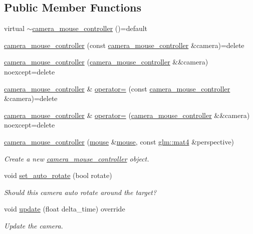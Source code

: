 \subsection*{Public Member Functions}
\begin{DoxyCompactItemize}
\item 
virtual \mbox{\hyperlink{classmoka_1_1camera__mouse__controller_ae40951c1866e72474b6ed7324e6db72f}{$\sim$camera\+\_\+mouse\+\_\+controller}} ()=default
\item 
\mbox{\hyperlink{classmoka_1_1camera__mouse__controller_aca731723969ae09a48d21f0c5814ba27}{camera\+\_\+mouse\+\_\+controller}} (const \mbox{\hyperlink{classmoka_1_1camera__mouse__controller}{camera\+\_\+mouse\+\_\+controller}} \&camera)=delete
\item 
\mbox{\hyperlink{classmoka_1_1camera__mouse__controller_ab07b5dda70f97878a888e406e3be3bb4}{camera\+\_\+mouse\+\_\+controller}} (\mbox{\hyperlink{classmoka_1_1camera__mouse__controller}{camera\+\_\+mouse\+\_\+controller}} \&\&camera) noexcept=delete
\item 
\mbox{\hyperlink{classmoka_1_1camera__mouse__controller}{camera\+\_\+mouse\+\_\+controller}} \& \mbox{\hyperlink{classmoka_1_1camera__mouse__controller_a510baecd761914c83b7330549dbb7197}{operator=}} (const \mbox{\hyperlink{classmoka_1_1camera__mouse__controller}{camera\+\_\+mouse\+\_\+controller}} \&camera)=delete
\item 
\mbox{\hyperlink{classmoka_1_1camera__mouse__controller}{camera\+\_\+mouse\+\_\+controller}} \& \mbox{\hyperlink{classmoka_1_1camera__mouse__controller_a5e016278de0bea6870520235fee70dba}{operator=}} (\mbox{\hyperlink{classmoka_1_1camera__mouse__controller}{camera\+\_\+mouse\+\_\+controller}} \&\&camera) noexcept=delete
\item 
\mbox{\hyperlink{classmoka_1_1camera__mouse__controller_a82038995539fcb2b51f88d2669bb6fcb}{camera\+\_\+mouse\+\_\+controller}} (\mbox{\hyperlink{classmoka_1_1mouse}{mouse}} \&\mbox{\hyperlink{classmoka_1_1mouse}{mouse}}, const \mbox{\hyperlink{namespacemoka_aed2224bc0e5b79e57a8975ded94ee1aaabe14b41eb96410ea28b32bc138d885ae}{glm\+::mat4}} \&perspective)
\begin{DoxyCompactList}\small\item\em Create a new \mbox{\hyperlink{classmoka_1_1camera__mouse__controller}{camera\+\_\+mouse\+\_\+controller}} object. \end{DoxyCompactList}\item 
void \mbox{\hyperlink{classmoka_1_1camera__mouse__controller_ab46814bbaba3bbbfad0337566fab052a}{set\+\_\+auto\+\_\+rotate}} (bool rotate)
\begin{DoxyCompactList}\small\item\em Should this camera auto rotate around the target? \end{DoxyCompactList}\item 
void \mbox{\hyperlink{classmoka_1_1camera__mouse__controller_a088d8d1f491895f394e67253d4ee4a76}{update}} (float delta\+\_\+time) override
\begin{DoxyCompactList}\small\item\em Update the camera. \end{DoxyCompactList}\end{DoxyCompactItemize}
